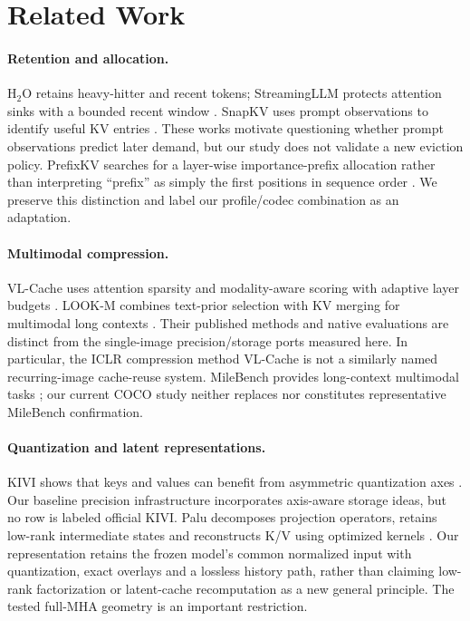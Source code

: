 \section{Related Work}
\label{sec:related}
\paragraph{Retention and allocation.}
H$_2$O retains heavy-hitter and recent tokens; StreamingLLM protects
attention sinks with a bounded recent window
\citep{zhang2023h2o,xiao2024streaming}. SnapKV uses prompt observations to
identify useful KV entries \citep{li2024snapkv}. These works motivate
questioning whether prompt observations predict later demand, but our
study does not validate a new eviction policy. PrefixKV searches for a
layer-wise importance-prefix allocation rather than interpreting
``prefix'' as simply the first positions in sequence order
\citep{wang2025prefixkv}. We preserve this distinction and label our
profile/codec combination as an adaptation.

\paragraph{Multimodal compression.}
VL-Cache uses attention sparsity and modality-aware scoring with adaptive
layer budgets \citep{tu2025vlcache}. LOOK-M combines text-prior selection
with KV merging for multimodal long contexts \citep{wan2024lookm}.
Their published methods and native evaluations are distinct from the
single-image precision/storage ports measured here. In particular, the
ICLR compression method VL-Cache is not a similarly named recurring-image
cache-reuse system. MileBench provides long-context multimodal tasks
\citep{song2024milebench}; our current COCO study neither replaces nor
constitutes representative MileBench confirmation.

\paragraph{Quantization and latent representations.}
KIVI shows that keys and values can benefit from asymmetric quantization
axes \citep{liu2024kivi}. Our baseline precision infrastructure incorporates
axis-aware storage ideas, but no row is labeled official KIVI. Palu
decomposes projection operators, retains low-rank intermediate states and
reconstructs K/V using optimized kernels \citep{chang2024palu}.
Our representation retains the frozen model's common normalized input
with quantization, exact overlays and a lossless history path, rather than
claiming low-rank factorization or latent-cache recomputation as a new
general principle. The tested full-MHA geometry is an important restriction.

